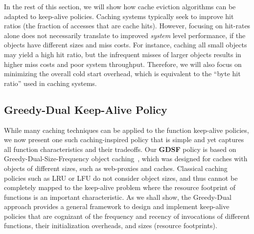 In the rest of this section, we will show how cache eviction algorithms can be adapted to keep-alive policies.
Caching systems typically seek to improve hit ratios (the fraction of accesses that are cache hits).
However, focusing on hit-rates alone does not necessarily translate to improved \emph{system} level performance, if the objects have different sizes and miss costs.
For instance, caching all small objects may yield a high hit ratio, but the infrequent misses of larger objects results in higher miss costs and poor system throughput. 
Therefore, we will also focus on minimizing the overall cold start overhead, which is equivalent to the ``byte hit ratio'' used in caching systems.







\subsection{Greedy-Dual Keep-Alive Policy}
\label{subsec:gdsf}
\vspace*{\subsecspace}

While many caching techniques can be applied to the function keep-alive policies, we now present one such caching-inspired policy that is simple and yet captures all function characteristics and their tradeoffs.
Our \textbf{GDSF} policy is based on Greedy-Dual-Size-Frequency object caching~\cite{gdsf}, which was designed for caches with objects of  different sizes, such as web-proxies and caches. 
Classical caching policies such as LRU or LFU do not consider object sizes, and thus cannot be completely mapped to the keep-alive problem where the resource footprint of functions is an important characteristic. 
As we shall show, the Greedy-Dual approach provides a general framework to design and implement keep-alive policies that are cognizant of the  frequency and recency of invocations of different functions, their initialization overheads, and sizes (resource footprints). 


